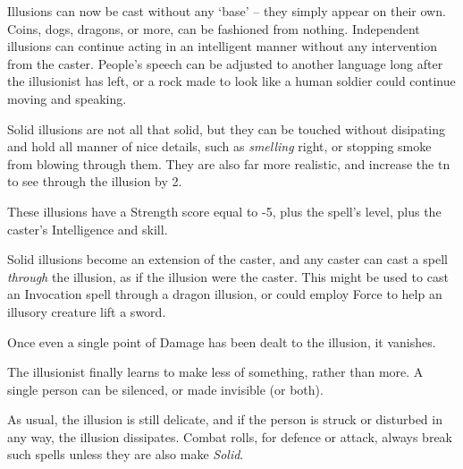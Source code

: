 \begin{multicols}{2}

Illusions can now be cast without any `base' -- they simply appear on their own.
Coins, dogs, dragons, or more, can be fashioned from nothing.
Independent illusions can continue acting in an intelligent manner without any intervention from the caster.
People's speech can be adjusted to another language long after the illusionist has left, or a rock made to look like a human soldier could continue moving and speaking.


Solid illusions are not all that solid, but they can be touched without disipating and hold all manner of nice details, such as \emph{smelling} right, or stopping smoke from blowing through them.  They are also far more realistic, and increase the \gls{tn} to see through the illusion by 2.

These illusions have a Strength score equal to -5, plus the spell's level, plus the caster's Intelligence and skill.

Solid illusions become an extension of the caster, and any caster can cast a spell \textit{through} the illusion, as if the illusion were the caster.  This might be used to cast an Invocation spell through a dragon illusion, or could employ Force to help an illusory creature lift a sword.

Once even a single point of Damage has been dealt to the illusion, it vanishes.


The illusionist finally learns to make less of something, rather than more.  A single person can be silenced, or made invisible (or both).

As usual, the illusion is still delicate, and if the person is struck or disturbed in any way, the illusion dissipates.  Combat rolls, for defence or attack, always break such spells unless they are also make \textit{Solid}.

\end{multicols}


